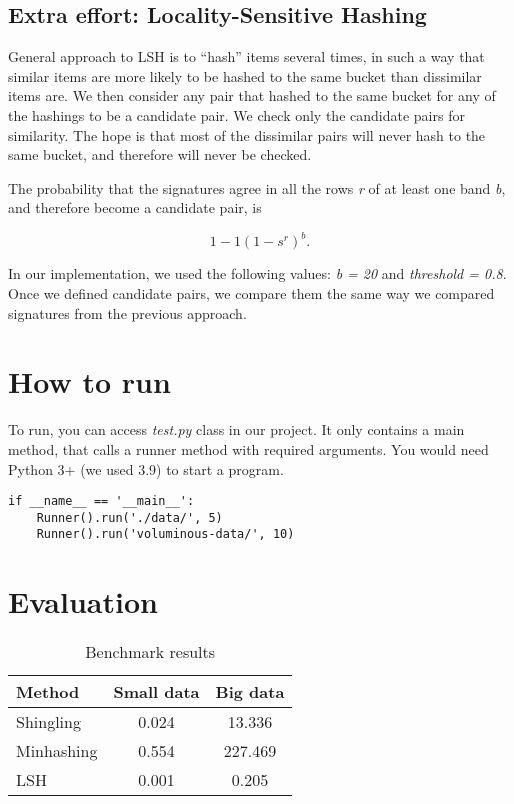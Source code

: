 \documentclass[a4paper, 11pt]{article}
\begin{document}
\subsection{Extra effort: Locality-Sensitive Hashing}

General approach to LSH is to “hash” items several times, in such a way that similar items are more likely to be hashed to the same bucket than dissimilar items are. We then consider any pair that hashed to the same bucket for any of the hashings to be a candidate pair. We check only the candidate pairs for similarity. The hope is that most of the dissimilar pairs will never hash to the same bucket, and therefore will never be checked.

The probability that the signatures agree in all the rows \textit{r} of at least one band \textit{b}, and therefore become a candidate pair, is

\begin{equation}
1 - 1 (1 - s^r)^b.
\end{equation}

In our implementation, we used the following values:  \textit{b = 20} and \textit{threshold = 0.8}. Once we defined candidate pairs, we compare them the same way we compared signatures from the previous approach.

\section{How to run}
To run, you can access \textit{test.py} class in our project. It only contains a main method, that calls a runner method with required arguments. You would need Python 3+ (we used 3.9) to start a program.

\begin{verbatim}
if __name__ == '__main__':
    Runner().run('./data/', 5)
    Runner().run('voluminous-data/', 10)
\end{verbatim}

\section{Evaluation}

\begin{table}[h]
\centering
\begin{tabular}{lcc}
Method & Small data & Big data \\\hline
Shingling & 0.024 & 13.336  \\\hline
Minhashing & 0.554 & 227.469  \\\hline
LSH & 0.001 & 0.205 \\\hline
\end{tabular}
\caption{Benchmark results}
\label{tab:results}
\end{table}
\end{document}
